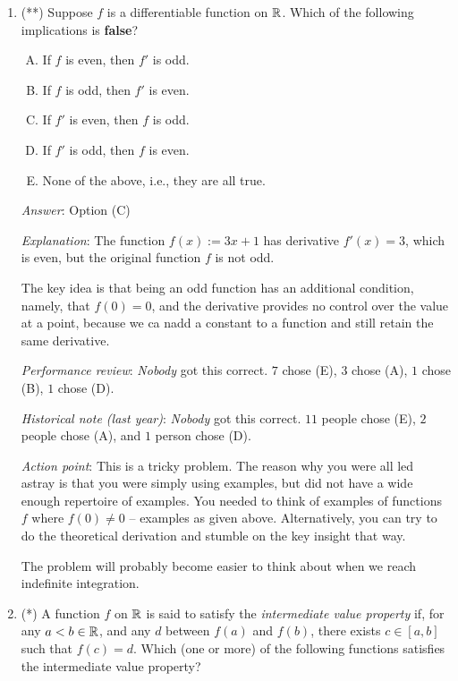 \documentclass[10pt]{amsart}
\begin{document}
\begin{enumerate}

\item (**) Suppose $f$ is a differentiable function on $\mathbb{R}$. Which of
  the following implications is {\bf false}?

  \begin{enumerate}[(A)]
  \item If $f$ is even, then $f'$ is odd.
  \item If $f$ is odd, then $f'$ is even.
  \item If $f'$ is even, then $f$ is odd.
  \item If $f'$ is odd, then $f$ is even.
  \item None of the above, i.e., they are all true.
  \end{enumerate}

  {\em Answer}: Option (C)

  {\em Explanation}: The function $f(x) := 3x + 1$ has derivative
  $f'(x) = 3$, which is even, but the original function $f$ is not
  odd.

  The key idea is that being an odd function has an additional
  condition, namely, that $f(0) = 0$, and the derivative provides no
  control over the value at a point, because we ca nadd a constant to
  a function and still retain the same derivative.

  {\em Performance review}: {\em Nobody} got this correct. $7$ chose
  (E), $3$ chose (A), $1$ chose (B), $1$ chose (D).

  {\em Historical note (last year)}: {\em Nobody} got this correct. $11$
  people chose (E), $2$ people chose (A), and $1$ person chose (D).

  {\em Action point}: This is a tricky problem. The reason why you
  were all led astray is that you were simply using examples, but did
  not have a wide enough repertoire of examples. You needed to think
  of examples of functions $f$ where $f(0) \ne 0$ -- examples as given
  above. Alternatively, you can try to do the theoretical derivation
  and stumble on the key insight that way.

  The problem will probably become easier to think about when we reach
  indefinite integration.

\item (*) A function $f$ on $\mathbb{R}$ is said to satisfy the {\em intermediate
  value property} if, for any $a < b \in \mathbb{R}$, and any $d$ between
  $f(a)$ and $f(b)$, there exists $c \in [a,b]$ such that $f(c) =
  d$. Which (one or more) of the following functions satisfies the
  intermediate value property?


\end{enumerate}
\end{document}
